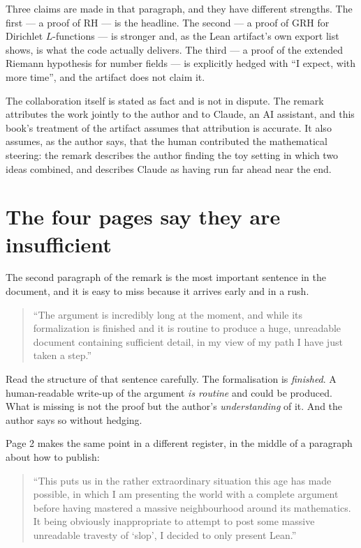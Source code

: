 Three claims are made in that paragraph, and they have different strengths. The
first --- a proof of RH --- is the headline. The second --- a proof of GRH for
Dirichlet $L$-functions --- is stronger and, as the Lean artifact's own export
list shows, is what the code actually delivers. The third --- a proof of the
extended Riemann hypothesis for number fields --- is explicitly hedged with
``I expect, with more time'', and the artifact does not claim it.

The collaboration itself is stated as fact and is not in dispute. The remark
attributes the work jointly to the author and to Claude, an AI assistant, and
this book's treatment of the artifact assumes that attribution is accurate. It
also assumes, as the author says, that the human contributed the mathematical
steering: the remark describes the author finding the toy setting in which two
ideas combined, and describes Claude as having run far ahead near the end.

\section{The four pages say they are insufficient}The second paragraph of the remark is the most important sentence in the
document, and it is easy to miss because it arrives early and in a rush.

\begin{quote}
\small
``The argument is incredibly long at the moment, and while its formalization is
finished and it is routine to produce a huge, unreadable document containing
sufficient detail, in my view of my path I have just taken a step.''
\end{quote}

Read the structure of that sentence carefully. The formalisation is
\emph{finished}. A human-readable write-up of the argument \emph{is routine} and
could be produced. What is missing is not the proof but the author's
\emph{understanding} of it. And the author says so without hedging.

Page 2 makes the same point in a different register, in the middle of a
paragraph about how to publish:

\begin{quote}
\small
``This puts us in the rather extraordinary situation this age has made possible,
in which I am presenting the world with a complete argument before having
mastered a massive neighbourhood around its mathematics. It being obviously
inappropriate to attempt to post some massive unreadable travesty of `slop', I
decided to only present Lean.''
\end{quote}

